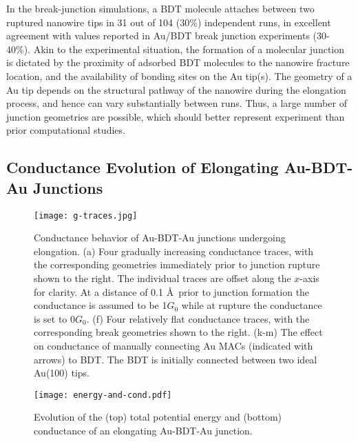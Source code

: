 \documentclass[10pt]{report}  %
\newcommand\findent{\hspace*{\parindent}}
\begin{document}
\findent In the break-junction simulations, a BDT molecule attaches between two ruptured nanowire tips in 31 out of 104 (30\%) independent runs, in excellent agreement with values reported in Au/BDT break junction experiments (30-40\%).\cite{Xiao:2004} Akin to the experimental situation, the formation of a molecular junction is dictated by the proximity of adsorbed BDT molecules to the nanowire fracture location, and the availability of bonding sites on the Au tip(s). The geometry of a Au tip depends on the structural pathway of the nanowire during the elongation process, and hence can vary substantially between runs.\cite{Coura:2004, Pu:2008, Tavazza:2010, French:2011,Iacovella:2011} Thus, a large number of junction geometries are possible, which should better represent experiment than prior computational studies.

\subsection{Conductance Evolution of Elongating Au-BDT-Au Junctions}

\begin{figure}[b!]
	\centering
	\texttt{[image: g-traces.jpg]}
	\caption{Conductance behavior of Au-BDT-Au junctions undergoing elongation. (a) Four gradually increasing conductance traces, with the corresponding geometries immediately prior to junction rupture shown to the right. The individual traces are offset along the $x$-axis for clarity. At a distance of 0.1 \AA\ prior to junction formation the conductance is assumed to be 1$G_{0}$ while at rupture the conductance is set to 0$G_{0}$. (f) Four relatively flat conductance traces, with the corresponding break geometries shown to the right. (k-m) The effect on conductance of manually connecting Au MACs (indicated with arrows) to BDT.  The BDT is initially connected between two ideal Au(100) tips. }
	\label{fig:g-traces}
\end{figure}

\begin{figure}[h!]
	\centering
	\texttt{[image: energy-and-cond.pdf]}
	\caption{Evolution of the (top) total potential energy and (bottom) conductance of an elongating Au-BDT-Au junction. }
	\label{fig:energy-and-cond}
\end{figure}
\end{document}
